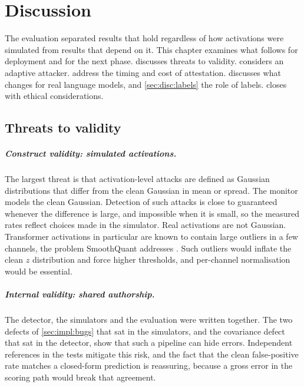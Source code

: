 \chapter{Discussion}
\label{ch:discussion}

The evaluation separated results that hold regardless of how activations were simulated from
results that depend on it. This chapter examines what follows for deployment and for the next
phase.  discusses threats to validity. 
considers an adaptive attacker.  address the timing and
cost of attestation.  discusses what changes for real language models, and
\cref{sec:disc:labels} the role of labels.  closes with ethical
considerations.

\section{Threats to validity}
\label{sec:disc:validity}

\paragraph{Construct validity: simulated activations.} The largest threat is that activation-level
attacks are defined as Gaussian distributions that differ from the clean Gaussian in mean or
spread. The monitor models the clean Gaussian. Detection of such attacks is close to guaranteed
whenever the difference is large, and impossible when it is small, so the measured rates reflect
choices made in the simulator. Real activations are not Gaussian. Transformer activations in
particular are known to contain large outliers in a few channels, the problem SmoothQuant
addresses \cite{xiao2023smoothquant}. Such outliers would inflate the clean $z$ distribution and
force higher thresholds, and per-channel normalisation would be essential.

\paragraph{Internal validity: shared authorship.} The detector, the simulators and the evaluation
were written together. The two defects of \cref{sec:impl:bugs} that sat in the simulators, and
the covariance defect that sat in the detector, show that such a pipeline can hide errors.
Independent references in the tests mitigate this risk, and the fact that the clean false-positive
rate matches a closed-form prediction is reassuring, because a gross error in the scoring path
would break that agreement.


